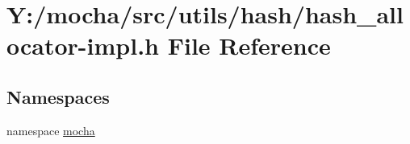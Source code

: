 \hypertarget{hash__allocator-impl_8h}{
\section{Y:/mocha/src/utils/hash/hash\_\-allocator-\/impl.h File Reference}
\label{hash__allocator-impl_8h}
}
\subsection*{Namespaces}
\begin{DoxyCompactItemize}
\item 
namespace \hyperlink{namespacemocha}{mocha}
\end{DoxyCompactItemize}
